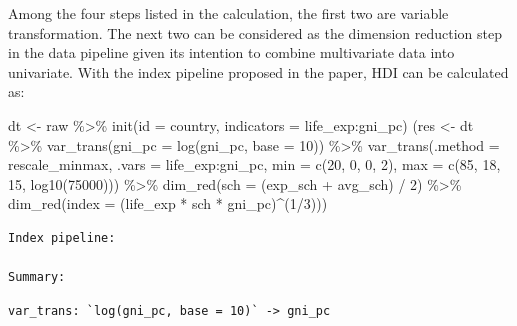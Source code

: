 \documentclass[
]{article}
\newenvironment{Shaded}{\begin{snugshade}}{\end{snugshade}}
\newcommand{\AttributeTok}[1]{\textcolor[rgb]{0.40,0.45,0.13}{#1}}
\newcommand{\DecValTok}[1]{\textcolor[rgb]{0.68,0.00,0.00}{#1}}
\newcommand{\FunctionTok}[1]{\textcolor[rgb]{0.28,0.35,0.67}{#1}}
\newcommand{\NormalTok}[1]{\textcolor[rgb]{0.00,0.23,0.31}{#1}}
\newcommand{\OtherTok}[1]{\textcolor[rgb]{0.00,0.23,0.31}{#1}}
\newcommand{\SpecialCharTok}[1]{\textcolor[rgb]{0.37,0.37,0.37}{#1}}
\begin{document}
Among the four steps listed in the calculation, the first two are
variable transformation. The next two can be considered as the dimension
reduction step in the data pipeline given its intention to combine
multivariate data into univariate. With the index pipeline proposed in
the paper, HDI can be calculated as:

\begin{Shaded}
\begin{Highlighting}[]
\NormalTok{dt }\OtherTok{\textless{}{-}}\NormalTok{ raw }\SpecialCharTok{\%\textgreater{}\%} \FunctionTok{init}\NormalTok{(}\AttributeTok{id =}\NormalTok{ country, }\AttributeTok{indicators =}\NormalTok{ life\_exp}\SpecialCharTok{:}\NormalTok{gni\_pc)}
\NormalTok{(res }\OtherTok{\textless{}{-}}\NormalTok{ dt }\SpecialCharTok{\%\textgreater{}\%}
  \FunctionTok{var\_trans}\NormalTok{(}\AttributeTok{gni\_pc =} \FunctionTok{log}\NormalTok{(gni\_pc, }\AttributeTok{base =} \DecValTok{10}\NormalTok{)) }\SpecialCharTok{\%\textgreater{}\%} 
  \FunctionTok{var\_trans}\NormalTok{(}\AttributeTok{.method =}\NormalTok{ rescale\_minmax, }\AttributeTok{.vars =}\NormalTok{ life\_exp}\SpecialCharTok{:}\NormalTok{gni\_pc,}
            \AttributeTok{min =} \FunctionTok{c}\NormalTok{(}\DecValTok{20}\NormalTok{, }\DecValTok{0}\NormalTok{, }\DecValTok{0}\NormalTok{, }\DecValTok{2}\NormalTok{), }\AttributeTok{max =} \FunctionTok{c}\NormalTok{(}\DecValTok{85}\NormalTok{, }\DecValTok{18}\NormalTok{, }\DecValTok{15}\NormalTok{, }\FunctionTok{log10}\NormalTok{(}\DecValTok{75000}\NormalTok{))) }\SpecialCharTok{\%\textgreater{}\%} 
  \FunctionTok{dim\_red}\NormalTok{(}\AttributeTok{sch =}\NormalTok{ (exp\_sch }\SpecialCharTok{+}\NormalTok{ avg\_sch) }\SpecialCharTok{/} \DecValTok{2}\NormalTok{) }\SpecialCharTok{\%\textgreater{}\%}
  \FunctionTok{dim\_red}\NormalTok{(}\AttributeTok{index =}\NormalTok{ (life\_exp }\SpecialCharTok{*}\NormalTok{ sch }\SpecialCharTok{*}\NormalTok{ gni\_pc)}\SpecialCharTok{\^{}}\NormalTok{(}\DecValTok{1}\SpecialCharTok{/}\DecValTok{3}\NormalTok{)))}
\end{Highlighting}
\end{Shaded}

\begin{verbatim}
Index pipeline: 

Summary: 
\end{verbatim}

\begin{verbatim}
var_trans: `log(gni_pc, base = 10)` -> gni_pc
\end{verbatim}
\end{document}
